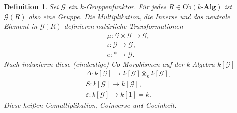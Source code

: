 \documentclass[a4paper, 11pt]{scrartcl}
\newcommand{\Ob}{\text{Ob}}
\theoremstyle{basicstyle}
\newtheorem{definition}{Definition}[section]
\begin{document}
    \begin{definition}
        Sei \(\mathcal{G}\) ein \(k\)-Gruppenfunktor.
        Für jedes \(R \in \Ob(k\textbf{-Alg})\) ist \(\mathcal{G}(R)\) also eine Gruppe.
        Die Multiplikation, die Inverse und das neutrale Element in \(\mathcal{G}(R)\) definieren natürliche Transformationen
        \begin{gather*}
            \mu : \mathcal{G} \times \mathcal{G} \longrightarrow \mathcal{G}, \\
            \iota : \mathcal{G} \longrightarrow \mathcal{G}, \\
            e : \ast \longrightarrow \mathcal{G}.
        \end{gather*}
        Nach  induzieren diese (eindeutige) Co-Morphismen auf der \(k\)-Algebra \(k[\mathcal{G}]\)
        \begin{gather*}
            \Delta : k[\mathcal{G}] \longrightarrow k[\mathcal{G}] \otimes_k k[\mathcal{G}], \\
            S: k[\mathcal{G}] \longrightarrow k[\mathcal{G}], \\
            \varepsilon : k[\mathcal{G}] \longrightarrow k[1] = k.
        \end{gather*}
        Diese heißen \emph{Comultiplikation}, \emph{Coinverse} und \emph{Coeinheit}.
    \end{definition}
\end{document}
